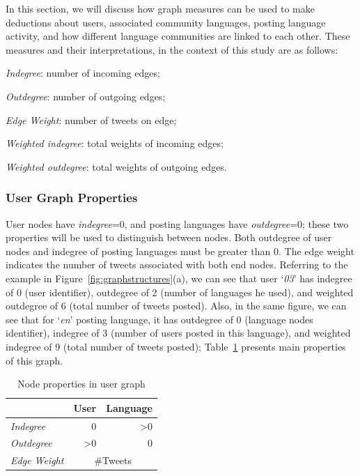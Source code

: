 \documentclass{llncs}
\begin{document}
In this section, we will discuss how graph measures can be used to
make deductions about users, associated community languages, posting
language activity, and how different language communities are linked
to each other.  These measures and their interpretations, in the
context of this study are as follows:\\

\begin{compactitem}
\item \emph{Indegree}: number of incoming edges;
\item \emph{Outdegree}: number of outgoing edges;
\item \emph{Edge Weight}: number of tweets on edge;
\item \emph{Weighted indegree}: total weights of incoming edges;
\item \emph{Weighted outdegree}: total weights of outgoing edges.
\end{compactitem}

\subsubsection{User Graph Properties}

User nodes have {\emph{indegree}}=0, and posting languages have
{\emph{outdegree}}=0; these two properties will be used to distinguish
between nodes. Both outdegree of user nodes and indegree of posting
languages must be greater than 0. The edge weight indicates the number
of tweets associated with both end nodes. Referring to the example in
Figure~\ref{fig:graphstructures}(a), we can see that user
`{\emph{03}}' has indegree of 0 (user identifier), outdegree of 2
(number of languages he used), and weighted outdegree of 6 (total
number of tweets posted). Also, in the same figure, we can see that
for `{\emph{en}}' posting language, it has outdegree of 0 (language
nodes identifier), indegree of 3 (number of users posted in this
language), and weighted indegree of 9 (total number of tweets posted);
Table~\ref{tbl:usersgraph} presents main properties of this graph.

\begin{table}[htb]
\centering
\begin{tabular}{@{}lrr@{}}
\toprule
\textbf{}& \textbf{User} & \textbf{Language} \\ \midrule
{\emph{Indegree}} & 0 & \textgreater0 \\
{\emph{Outdegree}} & \textgreater0 & 0 \\ 
{\emph{Edge Weight}}& \multicolumn{2}{c}{\#Tweets}\\ \bottomrule
\end{tabular}
\caption{Node properties in user graph}
\label{tbl:usersgraph}
\end{table}
\end{document}
